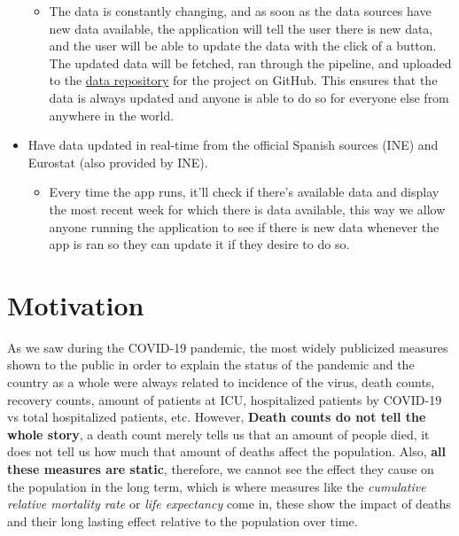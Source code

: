 \documentclass[
  a4paper]{article}
\providecommand{\tightlist}{%
  \setlength{\itemsep}{0pt}\setlength{\parskip}{0pt}}
\begin{document}
\begin{itemize}
  \begin{itemize}
  \tightlist
  \item
    The data is constantly changing, and as soon as the data sources
    have new data available, the application will tell the user there is
    new data, and the user will be able to update the data with the
    click of a button. The updated data will be fetched, ran through the
    pipeline, and uploaded to the
    \href{https://github.com/dreth/tfm_uc3m_data}{data repository} for
    the project on GitHub. This ensures that the data is always updated
    and anyone is able to do so for everyone else from anywhere in the
    world.
  \end{itemize}
\item
  Have data updated in real-time from the official Spanish sources (INE)
  and Eurostat (also provided by INE).

  \begin{itemize}
  \tightlist
  \item
    Every time the app runs, it'll check if there's available data and
    display the most recent week for which there is data available, this
    way we allow anyone running the application to see if there is new
    data whenever the app is ran so they can update it if they desire to
    do so.
  \end{itemize}
\end{itemize}

\newpage

\hypertarget{motivation}{%
\section{Motivation}\label{motivation}}

As we saw during the COVID-19 pandemic, the most widely publicized
measures shown to the public in order to explain the status of the
pandemic and the country as a whole were always related to incidence of
the virus, death counts, recovery counts, amount of patients at ICU,
hospitalized patients by COVID-19 vs total hospitalized patients, etc.
However, \textbf{Death counts do not tell the whole story}, a death
count merely tells us that an amount of people died, it does not tell us
how much that amount of deaths affect the population. Also, \textbf{all
these measures are static}, therefore, we cannot see the effect they
cause on the population in the long term, which is where measures like
the \emph{cumulative relative mortality rate} or \emph{life expectancy}
come in, these show the impact of deaths and their long lasting effect
relative to the population over time.
\end{document}
